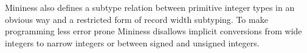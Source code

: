 Mininess also defines a subtype relation between primitive integer
types in an obvious way and a restricted form of record width
subtyping. To make programming less error prone Mininess disallows
implicit conversions from wide integers to narrow integers or between
signed and unsigned integers.


%
%
%
%
